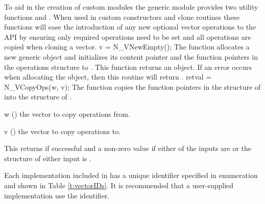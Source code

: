 To aid in the creation of custom {\nvector} modules the generic {\nvector}
module provides two utility functions  and .
When used in custom {\nvector} constructors and clone routines these functions
will ease the introduction of any new optional vector operations to the
{\nvector} API by ensuring only required operations need to be set and all
operations are copied when cloning a vector.
%
%
{
  v = N\_VNewEmpty();
}
{
  The function  allocates a new generic {\nvector} object and
  initializes its content pointer and the function pointers in the operations
  structure to .
}
{}
{
  This function returns an  object. If an error occurs when
  allocating the object, then this routine will return .
}
{}
%
%
{
  retval = N\_VCopyOps(w, v);
}
{
  The function  copies the function pointers in the 
  structure of  into the  structure of .
}
{
  \begin{args}[w]
  \item[w] () the vector to copy operations from.
  \item[v] () the vector to copy operations to.
  \end{args}
}
{
  This returns  if successful and a non-zero value if either of the inputs
  are  or the  structure of either input is .
}
{}

Each {\nvector} implementation included in {\sundials} has a unique
identifier specified in enumeration and shown in Table \ref{t:vectorIDs}.
It is recommended that a user-supplied {\nvector} implementation use the
 identifier.

